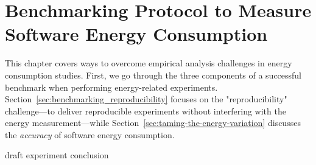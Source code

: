
\chapter{Benchmarking Protocol to Measure Software Energy Consumption}\label{chapter:benchmarking}
This chapter covers ways to overcome empirical analysis challenges in energy consumption studies.
First, we go through the three components of a successful benchmark when performing energy-related experiments.
Section~\ref{sec:benchmarking_reproducibility} focuses on the "reproducibility" challenge---to deliver reproducible experiments without interfering with the energy measurement---while Section~\ref{sec:taming-the-energy-variation} discusses the \emph{accuracy} of software energy consumption.

{draft}
{experiment}
{conclusion}

